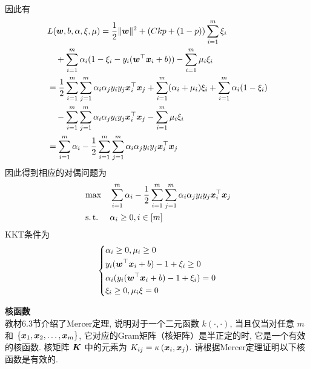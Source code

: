 \documentclass[answers]{exam}  %
\begin{document}
\begin{questions}
\begin{solution}
\begin{enumerate}
\[\begin{aligned}
            \end{aligned}    
        \]
        因此有        
        \[
            \begin{aligned}
                &L(\boldsymbol{w},b,\alpha,\xi,\mu)=\frac12\|\boldsymbol{w}\|^2+ (Ckp+(1-p))\sum_{i=1}^m\xi_i\\
                &\quad+\sum^m_{i=1}\alpha_i(1-\xi_i-y_i(\boldsymbol{w}^\top {\boldsymbol{x}}_i+b))-\sum^m_{i=1}\mu_i\xi_i\\
                &=\frac12\sum^m_{i=1}\sum^m_{j=1}\alpha_i\alpha_j y_i y_j{\boldsymbol{x}}_i^\top{\boldsymbol{x}}_j+\sum^m_{i=1}(\alpha_i+\mu_i)\xi_i+\sum^m_{i=1}\alpha_i(1-\xi_i)\\
                &\quad-\sum^m_{i=1}\sum^m_{j=1}\alpha_i\alpha_j y_i y_j{\boldsymbol{x}}_i^\top{\boldsymbol{x}}_j-\sum^m_{i=1}\mu_i\xi_i\\
                &=\sum^m_{i=1}\alpha_i-\frac12\sum^m_{i=1}\sum^m_{j=1}\alpha_i\alpha_j y_i y_j{\boldsymbol{x}}_i^\top{\boldsymbol{x}}_j
            \end{aligned}
        \]
        因此得到相应的对偶问题为
        \[
            \begin{aligned}
                &\max&&\sum^m_{i=1}\alpha_i-\frac12\sum^m_{i=1}\sum^m_{j=1}\alpha_i\alpha_j y_i y_j\vx_i^\top\vx_j\\
                &\operatornamewithlimits{s.t.}&&\alpha_i\ge0,i\in[m]
            \end{aligned}  
        \]
        KKT条件为
        \[\left\{
            \begin{aligned}
                &\alpha_i\ge 0, \mu_i\ge 0\\
                &y_i(\boldsymbol{w}^\top {\boldsymbol{x}}_i+b)-1+\xi_i\ge0\\
                &\alpha_i(y_i(\boldsymbol{w}^\top {\boldsymbol{x}}_i+b)-1+\xi_i)=0\\
                &\xi_i\ge0,\mu_i\xi=0
            \end{aligned}  
        \right.
        \]
        \end{enumerate}
	\end{solution}
\question [20] \textbf{核函数} \\
教材6.3节介绍了Mercer定理, 说明对于一个二元函数 $k(\cdot, \cdot)$, 当且仅当对任意 $m$ 和 $\{{\boldsymbol{x}}_{1}, {\boldsymbol{x}}_{2}, \ldots, {\boldsymbol{x}}_{m}\}$, 它对应的Gram矩阵（核矩阵）是半正定的时, 它是一个有效的核函数. 核矩阵 $\boldsymbol{K}$ 中的元素为 $K_{i j}=\kappa\left({\boldsymbol{x}}_{i}, {\boldsymbol{x}}_{j}\right)$. 请根据Mercer定理证明以下核函数是有效的.


\end{questions}
\end{document}
